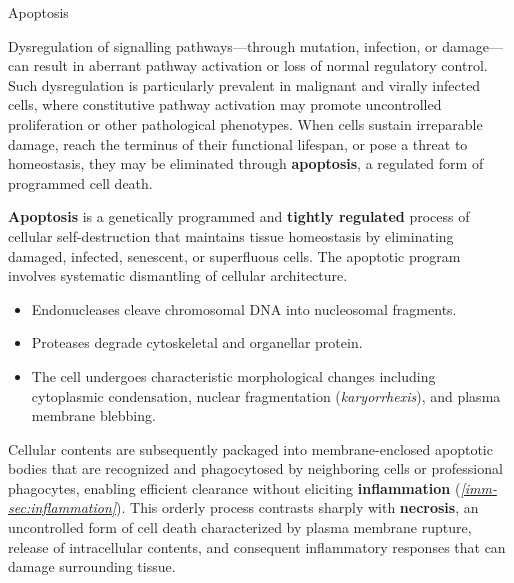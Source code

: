 \documentclass[10pt]{article}
\begin{document}
    \begin{core}{Apoptosis}

      Dysregulation of signalling pathways---through mutation, infection, or damage---can result in aberrant pathway activation or loss of normal regulatory control. Such dysregulation is particularly prevalent in malignant and virally infected cells, where constitutive pathway activation may promote uncontrolled proliferation or other pathological phenotypes. When cells sustain irreparable damage, reach the terminus of their functional lifespan, or pose a threat to homeostasis, they may be eliminated through \textbf{apoptosis}, a regulated form of programmed cell death.

      \textbf{Apoptosis} is a genetically programmed and \textbf{tightly regulated} process of cellular self-destruction that maintains tissue homeostasis by eliminating damaged, infected, senescent, or superfluous cells. The apoptotic program involves systematic dismantling of cellular architecture.

      \begin{itemize}

        \item Endonucleases cleave chromosomal DNA into nucleosomal fragments.

        \item Proteases degrade cytoskeletal and organellar protein.

      \item The cell undergoes characteristic morphological changes including cytoplasmic condensation, nuclear fragmentation (\textit{karyorrhexis}), and plasma membrane blebbing.
      \end{itemize}
      
      Cellular contents are subsequently packaged into membrane-enclosed apoptotic bodies that are recognized and phagocytosed by neighboring cells or professional phagocytes, enabling efficient clearance without eliciting \textbf{inflammation} (\textit{\autoref{imm-sec:inflammation}}). This orderly process contrasts sharply with \textbf{necrosis}, an uncontrolled form of cell death characterized by plasma membrane rupture, release of intracellular contents, and consequent inflammatory responses that can damage surrounding tissue.

    \end{core}
\end{document}
